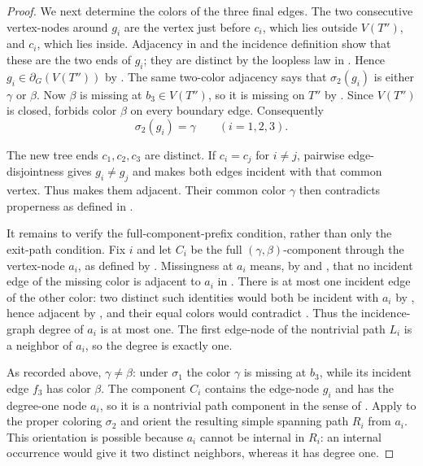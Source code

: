 \begin{proof}
We next determine the colors of the three final edges.  The two consecutive
vertex-nodes around $g_i$ are the vertex just before $c_i$, which lies
outside $V(T'')$, and $c_i$, which lies inside.  Adjacency in
 and the incidence definition
 show that these are the two ends of $g_i$; they are
distinct by the loopless law in .  Hence
$g_i\in\partial_G(V(T''))$ by .  The same
two-color adjacency says that $\sigma_2(g_i)$ is either $\gamma$ or
$\beta$.  Now $\beta$ is missing at $b_3\in V(T'')$, so it is missing on
$T''$ by .  Since $V(T'')$ is closed,
 forbids color $\beta$ on every boundary
edge.  Consequently
\[
 \sigma_2(g_i)=\gamma\qquad(i=1,2,3).
\]

The new tree ends $c_1,c_2,c_3$ are distinct.  If $c_i=c_j$ for
$i\ne j$, pairwise edge-disjointness gives $g_i\ne g_j$ and
 makes both edges incident with that common vertex.
Thus  makes them adjacent.  Their common color
$\gamma$ then contradicts properness as defined in
.

It remains to verify the full-component-prefix condition, rather than only
the exit-path condition.  Fix $i$ and let $C_i$ be the full
$(\gamma,\beta)$-component through the vertex-node $a_i$, as defined by
.  Missingness at $a_i$ means, by
 and , that no incident edge
of the missing color is adjacent to $a_i$ in
.  There is at most one incident edge of
the other color: two distinct such identities would both be incident with
$a_i$ by , hence adjacent by ,
and their equal colors would contradict
.  Thus the incidence-graph degree of $a_i$
is at most one.  The first edge-node of the nontrivial path $L_i$ is a
neighbor of $a_i$, so the degree is exactly one.

As recorded above, $\gamma\ne\beta$: under $\sigma_1$ the color $\gamma$
is missing at $b_3$, while its incident edge $f_3$ has color $\beta$.
The component $C_i$ contains the edge-node $g_i$ and has the degree-one
node $a_i$, so it is a nontrivial path component in the sense of
.  Apply
 to the proper coloring $\sigma_2$
and orient the resulting simple spanning path $R_i$ from $a_i$.  This
orientation is possible because $a_i$ cannot be internal in $R_i$: an
internal occurrence would give it two distinct neighbors, whereas it has
degree one.


\end{proof}
